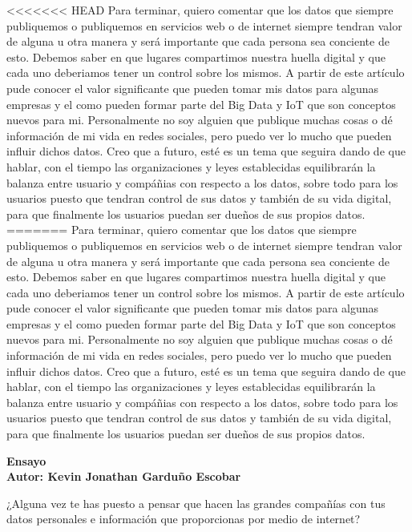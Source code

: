 \documentclass[12pt]{report}
\begin{document}
\begin{enumerate}[label=\textbf{\arabic*.}, leftmargin=*]
\begin{enumerate}[label=\textbf{\alph*.}, leftmargin=*, itemsep=1.0em]
<<<<<<< HEAD
Para terminar, quiero comentar que los datos que siempre publiquemos o publiquemos en servicios web o de internet siempre tendran valor de alguna u otra manera y será importante que cada persona sea conciente de esto. Debemos saber en que lugares compartimos nuestra huella digital y que cada uno deberiamos tener un control sobre los mismos. A partir de este artículo pude conocer el valor significante que pueden tomar mis datos para algunas empresas y el como pueden formar parte del Big Data y IoT que son conceptos nuevos para mi. Personalmente no soy alguien que publique muchas cosas o dé información de mi vida en redes sociales, pero puedo ver lo mucho que pueden influir dichos datos. Creo que a futuro, esté es un tema que seguira dando de que hablar, con el tiempo las organizaciones y leyes establecidas equilibrarán la balanza entre usuario y compáñias con respecto a los datos, sobre todo para los usuarios puesto que tendran control de sus datos y también de su vida digital, para que finalmente los usuarios puedan ser dueños de sus propios datos.
=======
Para terminar, quiero comentar que los datos que siempre publiquemos o publiquemos en servicios web o de internet siempre tendran valor de alguna u otra manera y será importante que cada persona sea conciente de esto. Debemos saber en que lugares compartimos nuestra huella digital y que cada uno deberiamos tener un control sobre los mismos. A partir de este artículo pude conocer el valor significante que pueden tomar mis datos para algunas empresas y el como pueden formar parte del Big Data y IoT que son conceptos nuevos para mi. Personalmente no soy alguien que publique muchas cosas o dé información de mi vida en redes sociales, pero puedo ver lo mucho que pueden influir dichos datos. Creo que a futuro, esté es un tema que seguira dando de que hablar, con el tiempo las organizaciones y leyes establecidas equilibrarán la balanza entre usuario y compáñias con respecto a los datos, sobre todo para los usuarios puesto que tendran control de sus datos y también de su vida digital, para que finalmente los usuarios puedan ser dueños de sus propios datos. 

\newpage
\textbf{Ensayo\\
        Autor: Kevin Jonathan Garduño Escobar}

¿Alguna vez te has puesto a pensar que hacen las grandes compañías con tus datos personales e información que proporcionas por medio de internet?\\


\end{enumerate}
\end{enumerate}
\end{document}
